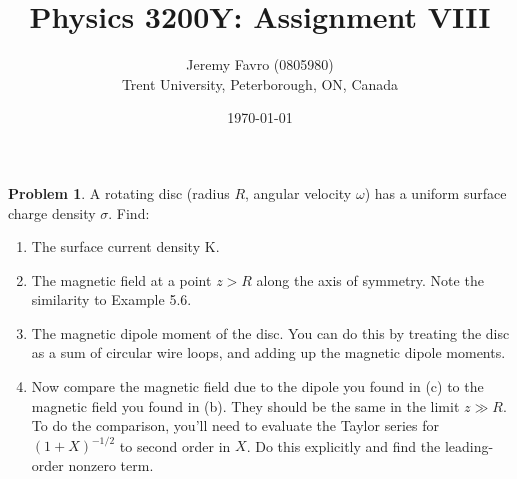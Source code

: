 \documentclass[10pt]{article}
\title{Physics 3200Y: Assignment VIII}
\author{Jeremy Favro (0805980) \\ Trent University, Peterborough, ON, Canada}
\date{\today}
\theoremstyle{definition}
\newtheorem{problem}{Problem}
\newcommand{\bv}[1]{\bm{\mathrm{#1}}}
\begin{document}
\maketitle

\begin{problem}
A rotating disc (radius $R$, angular velocity $\omega$) has a uniform surface charge density $\sigma$. Find:
\begin{enumerate}[label=(\alph*)]
  \item The surface current density $\bv{K}$.
  \item The magnetic field at a point $z > R$ along the axis of symmetry. Note the similarity to
        Example 5.6.
  \item The magnetic dipole moment of the disc. You can do this by treating the disc as a sum
        of circular wire loops, and adding up the magnetic dipole moments.
  \item Now compare the magnetic field due to the dipole you found in (c) to the magnetic field
        you found in (b). They should be the same in the limit $z \gg R$. To do the comparison,
        you'll need to evaluate the Taylor series for $(1 + X)^{-1/2}$ to second order in $X$. Do this
        explicitly and find the leading-order nonzero term.
\end{enumerate}
\end{problem}
\end{document}
